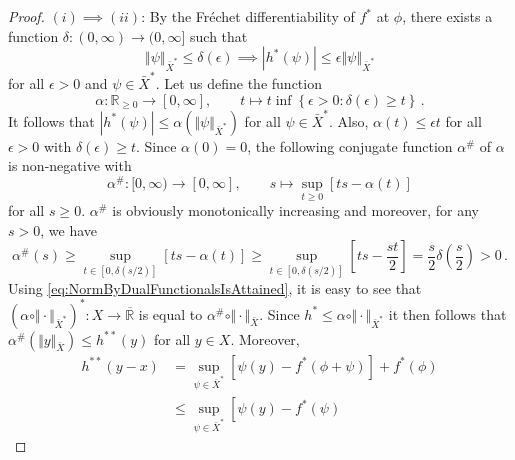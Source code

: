 \documentclass[
	paper=A4,
	pagesize=auto,
	fontsize=12pt
]{scrartcl}
\theoremstyle{plain}
\theoremstyle{remark}
\theoremstyle{definition}
\begin{document}
\begin{proof}
$(i) \implies (ii)$:
By the Fréchet differentiability of $f^*$ at $\phi$, there exists a function $\delta : (0, \infty) \to (0, \infty]$ such that
%
\begin{equation}
\left\Vert \psi \right\Vert_{\bar{X}^*} \le \delta \left( \epsilon \right)
\implies
\left| h^* \left( \psi \right) \right|
\le
\epsilon \left\Vert \psi \right\Vert_{\bar{X}^*}
\end{equation}
%
for all $\epsilon > 0$ and $\psi \in \bar{X}^*$.
Let us define the function
%
\begin{equation}
\alpha : \mathbb{R}_{\ge 0} \to [0, \infty], \qquad t \mapsto t \inf \left \{ \epsilon > 0 : \delta \left( \epsilon \right) \ge t \right \} \, .
\end{equation}
%
It follows that $| h^* ( \psi )|  \le \alpha ( \Vert \psi \Vert_{\bar{X}^*} )$ for all $\psi \in \bar{X}^*$.
Also, $\alpha( t ) \le \epsilon t$ for all $\epsilon > 0$ with $\delta( \epsilon ) \ge t$. 
Since $\alpha(0) = 0$, the following conjugate function $\alpha^\#$ of $\alpha$ is non-negative with
%
\begin{equation}
\alpha^{\#} : [0, \infty) \to [0, \infty], \qquad
s \mapsto \sup_{t \ge 0} \left[
t s - \alpha \left( t \right)
\right]
\end{equation}
%
for all $s \ge 0$.
$\alpha^{\#}$ is obviously monotonically increasing and moreover, for any $s > 0$, we have
%
\begin{equation}
\label{eq:AlphaHashIsPositiveForPositiveArguments}
\alpha^{\#} \left( s \right)
\ge
\sup_{t \in [0, \delta(s/2)]} \left[
t s - \alpha \left( t \right)
\right]
\ge
\sup_{t \in [0, \delta(s/2)]} \left[
t s - \frac{st}{2}
\right]
=
\frac{s}{2} \delta \left( \frac{s}{2} \right)
>
0 \, .
\end{equation}
%
Using \cref{eq:NormByDualFunctionalsIsAttained}, it is easy to see that $(\alpha \circ \Vert \cdot \Vert_{\bar{X}^*})^* : X \to \overline{\mathbb{R}}$ is equal to $\alpha^{\#} \circ \Vert \cdot \Vert_{\bar{X}}$.
Since $h^* \le \alpha \circ \Vert \cdot \Vert_{\bar{X}^*}$ it then follows that $\alpha^{\#} ( \Vert y \Vert_{\bar{X}} )\le h^{**} ( y )$ for all $y \in X$.
Moreover,
%
\begin{equation}
\begin{aligned}
h^{**} \left( y  - x \right)
&=
\sup_{\psi \in \bar{X}^*} \left[
\psi \left( y \right)
-
f^* \left( \phi + \psi \right)
\right]
+
f^* \left( \phi \right) \\
&\le
\sup_{\psi \in \bar{X}^*} \left[
\psi \left( y \right)
-
f^* \left( \psi \right)

\end{aligned}
\end{equation}
\end{proof}
\end{document}
